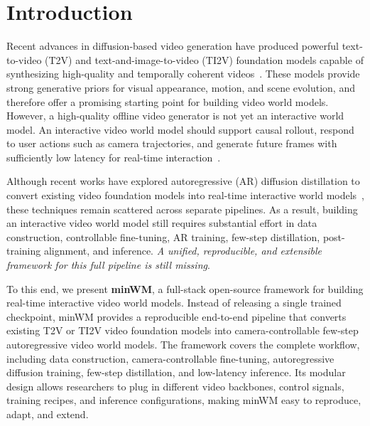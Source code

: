 \section{Introduction}

Recent advances in diffusion-based video generation have produced powerful text-to-video (T2V) and text-and-image-to-video (TI2V) foundation models capable of synthesizing high-quality and temporally coherent videos~\cite{videoworldsimulators2024,bao2024vidu,yang2024cogvideox,lin2024open,zheng2024open,wan2025wan,kong2024hunyuanvideo}. These models provide strong generative priors for visual appearance, motion, and scene evolution, and therefore offer a promising starting point for building video world models. However, a high-quality offline video generator is not yet an interactive world model. An interactive video world model should support causal rollout, respond to user actions such as camera trajectories, and generate future frames with sufficiently low latency for real-time interaction~\cite{sun2025worldplay,genie3,tang2025hunyuan,mao2025yume,feng2025vidarc,huang2025live,sun2025streamavatar,hong2025relic,ye2025yan,xiang2025pan,he2025matrix,shin2025motionstream}.

Although recent works have explored autoregressive (AR) diffusion distillation to convert existing video foundation models into real-time interactive world models~\cite{yin2025slow,lin2025diffusion,huang2025self,zhu2026causal,zhao2026causal,yang2025towards}, these techniques remain scattered across separate pipelines. As a result, building an interactive video world model still requires substantial effort in data construction, controllable fine-tuning, AR training, few-step distillation, post-training alignment, and inference. \emph{A unified, reproducible, and extensible framework for this full pipeline is still missing}.



To this end, we present \textbf{minWM}, a full-stack open-source framework for building real-time interactive video world models. Instead of releasing a single trained checkpoint, minWM provides a reproducible end-to-end pipeline that converts existing T2V or TI2V video foundation models into camera-controllable few-step autoregressive video world models. The framework covers the complete workflow, including data construction, camera-controllable fine-tuning, autoregressive diffusion training, few-step distillation, and low-latency inference. Its modular design allows researchers to plug in different video backbones, control signals, training recipes, and inference configurations, making minWM easy to reproduce, adapt, and extend.

